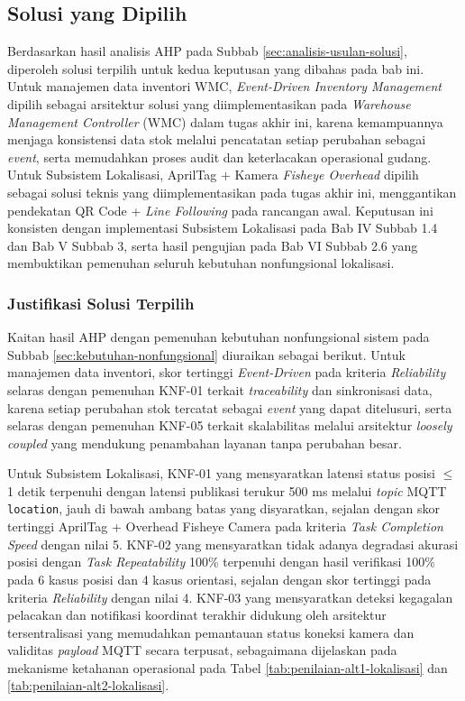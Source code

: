 \subsection{Solusi yang Dipilih}
\label{sec:solusi-terpilih}
Berdasarkan hasil analisis AHP pada Subbab \ref{sec:analisis-usulan-solusi}, diperoleh solusi terpilih untuk kedua keputusan yang dibahas pada bab ini. Untuk manajemen data inventori WMC, \textit{Event-Driven Inventory Management} dipilih sebagai arsitektur solusi yang diimplementasikan pada \textit{Warehouse Management Controller} (WMC) dalam tugas akhir ini, karena kemampuannya menjaga konsistensi data stok melalui pencatatan setiap perubahan sebagai \textit{event}, serta memudahkan proses audit dan keterlacakan operasional gudang. Untuk Subsistem Lokalisasi, AprilTag + Kamera \textit{Fisheye Overhead} dipilih sebagai solusi teknis yang diimplementasikan pada tugas akhir ini, menggantikan pendekatan QR Code + \textit{Line Following} pada rancangan awal. Keputusan ini konsisten dengan implementasi Subsistem Lokalisasi pada Bab IV Subbab 1.4 dan Bab V Subbab 3, serta hasil pengujian pada Bab VI Subbab 2.6 yang membuktikan pemenuhan seluruh kebutuhan nonfungsional lokalisasi.

\subsubsection{Justifikasi Solusi Terpilih}
Kaitan hasil AHP dengan pemenuhan kebutuhan nonfungsional sistem pada Subbab \ref{sec:kebutuhan-nonfungsional} diuraikan sebagai berikut. Untuk manajemen data inventori, skor tertinggi \textit{Event-Driven} pada kriteria \textit{Reliability} selaras dengan pemenuhan KNF-01 terkait \textit{traceability} dan sinkronisasi data, karena setiap perubahan stok tercatat sebagai \textit{event} yang dapat ditelusuri, serta selaras dengan pemenuhan KNF-05 terkait skalabilitas melalui arsitektur \textit{loosely coupled} yang mendukung penambahan layanan tanpa perubahan besar.

Untuk Subsistem Lokalisasi, KNF-01 yang mensyaratkan latensi status posisi $\leq$1 detik terpenuhi dengan latensi publikasi terukur 500 ms melalui \textit{topic} MQTT \texttt{location}, jauh di bawah ambang batas yang disyaratkan, sejalan dengan skor tertinggi AprilTag + Overhead Fisheye Camera pada kriteria \textit{Task Completion Speed} dengan nilai 5. KNF-02 yang mensyaratkan tidak adanya degradasi akurasi posisi dengan \textit{Task Repeatability} 100\% terpenuhi dengan hasil verifikasi 100\% pada 6 kasus posisi dan 4 kasus orientasi, sejalan dengan skor tertinggi pada kriteria \textit{Reliability} dengan nilai 4. KNF-03 yang mensyaratkan deteksi kegagalan pelacakan dan notifikasi koordinat terakhir didukung oleh arsitektur tersentralisasi yang memudahkan pemantauan status koneksi kamera dan validitas \textit{payload} MQTT secara terpusat, sebagaimana dijelaskan pada mekanisme ketahanan operasional pada Tabel \ref{tab:penilaian-alt1-lokalisasi} dan \ref{tab:penilaian-alt2-lokalisasi}.

